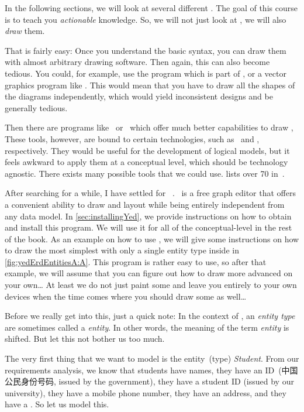 In the following sections, we will look at several different .
The goal of this course is to teach you \emph{actionable} knowledge.
So, we will not just look at , we will also \emph{draw} them.

That is fairly easy:
Once you understand the basic syntax, you can draw them with almost arbitrary drawing software.
Then again, this can also become tedious.
You could, for example, use the  program which is part of \libreoffice, or a vector graphics program like \inkscape.
This would mean that you have to draw all the shapes of the diagrams independently, which would yield inconsistent designs and be generally tedious.

Then there are programs like \pgmodeler\ or \mysqlWorkbench\ which offer much better capabilities to draw ,
These tools, however, are bound to certain technologies, such as \postgresql\ and \mysql, respectively.
They would be useful for the development of logical models, but it feels awkward to apply them at a conceptual level, which should be technology agnostic.
There exists many possible tools that we could use.
 lists over 70 in~\cite{B2025DS:7DMTC}.

After searching for a while, I have settled for \yEd~\cite{SG2015MDAWY,Y2011YGEM}.
\yEd\ is a free graph editor that offers a convenient ability to draw and layout  while being entirely independent from any data model.
In \cref{sec:installingYed}, we provide instructions on how to obtain and install this program.
We will use it for all of the conceptual-level  in the rest of the book.
As an example on how to use \yEd, we will give some instructions on how to draw the most simplest  with only a single entity type inside in \cref{fig:yedErdEntitiesA:A}.
This program is rather easy to use, so after that example, we will assume that you can figure out how to draw more advanced  on your own\dots
At least we do not just paint some  and leave you entirely to your own devices when the time comes where you should draw some as well{\dots}

Before we really get into this, just a quick note:
In the context of , an \emph{entity type} are sometimes called a \emph{entity}.
In other words, the meaning of the term \emph{entity} is shifted.
But let this not bother us too much.

The very first thing that we want to model is the entity~(type) \emph{Student}.
From our requirements analysis, we know that students have names, they have an ID~(中国公民身份号码\cite{GB116431999CIN}, issued by the government), they have a student ID (issued by our university), they have a mobile phone number, they have an address, and they have a .
So let us model this.

